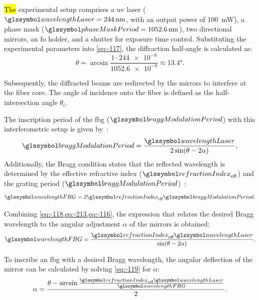 \documentclass[sensors,article,accept,pdftex,moreauthors]{Definitions/mdpi}
\begin{document}
\hl{The} %
 experimental setup comprises a \gls{uv} laser ($\wavelengthLaser=\SI{244}{\nm}$, with an output power of \SI{100}{\mW}), a phase mask ($\phaseMaskPeriod=\SI{1052.6}{\nm}$), two directional mirrors, an \gls{fo} holder, and a shutter for exposure time control. Substituting the experimental parameters into \cref{eq:-117}, the diffraction half-angle is calculated as:
\begin{equation}
	\theta=\arcsin\frac{\num{1}\cdot\num{244e-9}}{\num{1052.6e-9}}\approx\ang{13.4}.\label{eq:-118}
\end{equation}

Subsequently, the diffracted beams are redirected by the mirrors to interfere at the fiber core. The angle of incidence onto the fiber is defined as the half-intersection angle $\theta_i$.

The inscription period of the \gls{fbg} ($\braggModulationPeriod$) with this interferometric setup is given by~\citep{Kashyap2010}:
\begin{equation}
	\braggModulationPeriod=\frac{\wavelengthLaser}{2\sin\left(\theta-2\alpha\right)},\label{eq:-213}
\end{equation}
Additionally, the Bragg condition states that the reflected wavelength is determined by the effective refractive index ($\refractionIndex_{\text{eff}}$) and the grating period ($\braggModulationPeriod$)~\citep{Kashyap2010}:
\begin{equation}
	\wavelengthFBG=2\refractionIndex_{\text{eff}}\braggModulationPeriod.\label{eq:-116}
\end{equation}

Combining \cref{eq:-118,eq:-213,eq:-116}, the expression that relates the desired Bragg wavelength to the angular adjustment $\alpha$ of the mirrors is obtained:
\begin{equation}
	\wavelengthFBG=\frac{\refractionIndex_{\text{eff}}\wavelengthLaser}{\sin\left(\theta-2\alpha\right)}.\label{eq:-119}
\end{equation}

To inscribe an \gls{fbg} with a desired Bragg wavelength, the angular deflection of the mirror can be calculated by solving \cref{eq:-119} for $\alpha$:
\begin{equation}
	\alpha = \frac{\theta-\arcsin{\frac{\refractionIndex_{\text{eff}}\wavelengthLaser}{\wavelengthFBG}}}{2}.\label{eq:-120}
\end{equation}
\end{document}
